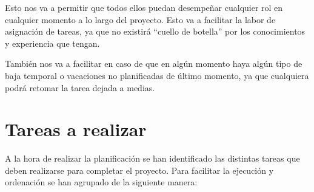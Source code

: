 \documentclass{\ClassPath/viu-tfm-template}
\begin{document}
Esto nos va a permitir que todos ellos puedan desempeñar cualquier rol en cualquier momento a lo largo del proyecto. Esto va a facilitar la labor de asignación de tareas, ya que no existirá “cuello de botella” por los conocimientos y experiencia que tengan.

También nos va a facilitar en caso de que en algún momento haya algún tipo de baja temporal o vacaciones no planificadas de último momento, ya que cualquiera podrá retomar la tarea dejada a medias.


\section{Tareas a realizar}

A la hora de realizar la planificación se han identificado las distintas tareas que deben realizarse para completar el proyecto. Para facilitar la ejecución y ordenación  se han agrupado de la siguiente manera:
\end{document}
